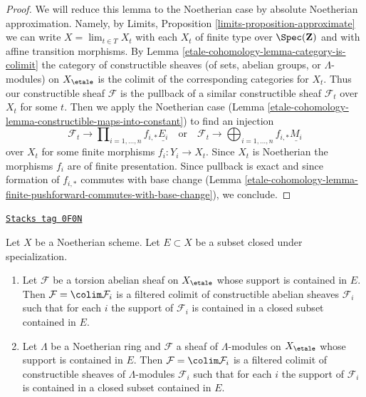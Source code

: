 \begin{proof}
We will reduce this lemma to the Noetherian case by absolute Noetherian
approximation. Namely, by
Limits, Proposition \ref{limits-proposition-approximate}
we can write $X = \lim_{t \in T} X_t$ with each $X_t$ of finite type over
$\Spec(\mathbf{Z})$ and with affine transition morphisms. By
Lemma \ref{etale-cohomology-lemma-category-is-colimit}
the category of constructible sheaves (of sets, abelian groups, or
$\Lambda$-modules) on $X_\etale$ is the colimit of the corresponding
categories for $X_t$. Thus our constructible sheaf $\mathcal{F}$
is the pullback of a similar constructible sheaf $\mathcal{F}_t$
over $X_t$ for some $t$. Then we apply the Noetherian case
(Lemma \ref{etale-cohomology-lemma-constructible-maps-into-constant})
to find an injection
$$
\mathcal{F}_t \longrightarrow
\prod\nolimits_{i = 1, \ldots, n} f_{i, *}\underline{E_i}
\quad\text{or}\quad
\mathcal{F}_t \longrightarrow
\bigoplus\nolimits_{i = 1, \ldots, n} f_{i, *}\underline{M_i}
$$
over $X_t$ for some finite morphisms $f_i : Y_i \to X_t$.
Since $X_t$ is Noetherian the morphisms $f_i$ are of finite presentation.
Since pullback is exact and since formation of $f_{i, *}$ commutes
with base change
(Lemma \ref{etale-cohomology-lemma-finite-pushforward-commutes-with-base-change}), we conclude.
\end{proof}

\begin{lemma}
\label{etale-cohomology-lemma-support-in-subset}
\href{https://stacks.math.columbia.edu/tag/0F0N}{\texttt{Stacks tag 0F0N}}

Let $X$ be a Noetherian scheme. Let $E \subset X$ be a subset closed
under specialization.
\begin{enumerate}
\item Let $\mathcal{F}$ be a torsion abelian sheaf on $X_\etale$
whose support is contained in $E$. Then $\mathcal{F} = \colim \mathcal{F}_i$
is a filtered colimit of constructible abelian sheaves $\mathcal{F}_i$
such that for each $i$ the support of $\mathcal{F}_i$ is contained in
a closed subset contained in $E$.
\item Let $\Lambda$ be a Noetherian ring and $\mathcal{F}$ a sheaf
of $\Lambda$-modules on $X_\etale$ whose support is contained in $E$.
Then $\mathcal{F} = \colim \mathcal{F}_i$
is a filtered colimit of constructible sheaves of
$\Lambda$-modules $\mathcal{F}_i$ such that for each $i$
the support of $\mathcal{F}_i$ is contained in a closed subset
contained in $E$.
\end{enumerate}
\end{lemma}

